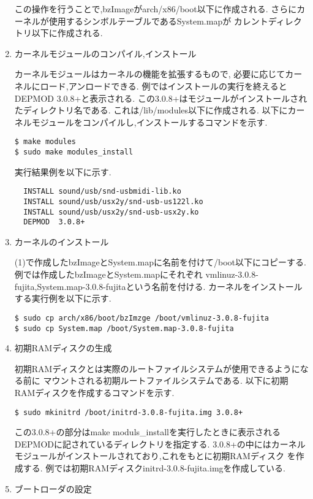 \documentclass[12pt]{jsarticle}
\begin{document}
\begin{enumerate}
この操作を行うことで,bzImageがarch/x86/boot以下に作成される.
さらにカーネルが使用するシンボルテーブルであるSystem.mapが
カレントディレクトリ以下に作成される.
\item カーネルモジュールのコンパイル,インストール

カーネルモジュールはカーネルの機能を拡張するもので,
必要に応じてカーネルにロード,アンロードできる.
例ではインストールの実行を終えるとDEPMOD 3.0.8+と表示される.
この3.0.8+はモジュールがインストールされたディレクトリ名である.
これは/lib/modules以下に作成される.
以下にカーネルモジュールをコンパイルし,インストールするコマンドを示す.

\begin{verbatim}
$ make modules
$ sudo make modules_install
\end{verbatim}

実行結果例を以下に示す.

\begin{verbatim}
  INSTALL sound/usb/snd-usbmidi-lib.ko
  INSTALL sound/usb/usx2y/snd-usb-us122l.ko
  INSTALL sound/usb/usx2y/snd-usb-usx2y.ko
  DEPMOD  3.0.8+
\end{verbatim}

\item カーネルのインストール

(1)で作成したbzImageとSystem.mapに名前を付けて/boot以下にコピーする.
例では作成したbzImageとSystem.mapにそれぞれ
vmlinuz-3.0.8-fujita,System.map-3.0.8-fujitaという名前を付ける.
カーネルをインストールする実行例を以下に示す.

\begin{verbatim}
$ sudo cp arch/x86/boot/bzImzge /boot/vmlinuz-3.0.8-fujita
$ sudo cp System.map /boot/System.map-3.0.8-fujita
\end{verbatim}

\item 初期RAMディスクの生成

初期RAMディスクとは実際のルートファイルシステムが使用できるようになる前に
マウントされる初期ルートファイルシステムである.
以下に初期RAMディスクを作成するコマンドを示す.

\begin{verbatim}
$ sudo mkinitrd /boot/initrd-3.0.8-fujita.img 3.0.8+
\end{verbatim}

この3.0.8+の部分はmake moduls\_installを実行したときに表示される
DEPMODに記されているディレクトリを指定する.
3.0.8+の中にはカーネルモジュールがインストールされており,これをもとに初期RAMディスク
を作成する.
例では初期RAMディスクinitrd-3.0.8-fujita.imgを作成している.
\item ブートローダの設定


\end{enumerate}
\end{document}

